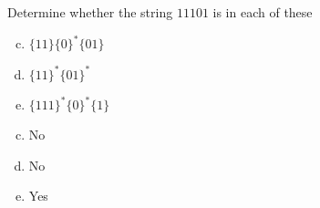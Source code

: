 \documentclass[../main.tex]{subfiles}
\begin{document}
Determine whether the string $11101$ is in each of these
\begin{enumerate}[a)]
	\setcounter{enumi}{2}
	\item $\{11\}\{0\}^\ast\{01\}$
	\setcounter{enumi}{3}
	\item $\{11\}^\ast\{01\}^\ast$
	\setcounter{enumi}{4}
	\item $\{111\}^\ast\{0\}^\ast\{1\}$
\end{enumerate}

\solution
\begin{enumerate}[a)]
	\setcounter{enumi}{2}
	\item No
	\setcounter{enumi}{3}
	\item No
	\setcounter{enumi}{4}
	\item Yes
\end{enumerate}
\end{document}
